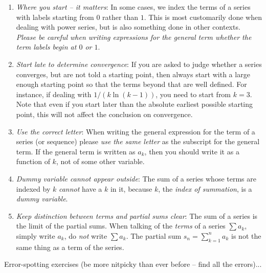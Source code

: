\documentclass[10pt]{amsart}
\begin{document}
\begin{enumerate}
\item {\em Where you start -- it matters}: In some cases, we index the
  terms of a series with labels starting from $0$ rather than
  $1$. This is most customarily done when dealing with power series,
  but is also something done in other contexts. {\em Please be careful
  when writing expressions for the general term whether the term
  labels begin at $0$ or $1$}.
\item {\em Start late to determine convergence}: If you are asked to
  judge whether a series converges, but are not told a starting point,
  then always start with a large enough starting point so that the
  terms beyond that are well defined. For instance, if dealing with
  $1/(k\ln(k - 1))$, you need to start from $k = 3$. Note that even if
  you start later than the absolute earliest possible starting point,
  this will not affect the conclusion on convergence.
\item {\em Use the correct letter}: When writing the general expression
  for the term of a series (or sequence) please {\em use the same
  letter} as the subscript for the general term. If the general term
  is written as $a_k$, then you should write it as a function of $k$,
  not of some other variable.
\item {\em Dummy variable cannot appear outside}: The sum of a series
  whose terms are indexed by $k$ {\em cannot} have a $k$ in it,
  because $k$, the {\em index of summation}, is a {\em dummy
  variable}.
\item {\em Keep distinction between terms and partial sums clear}: The
  sum of a series is the limit of the partial sums. When talking of
  the {\em terms} of a series $\sum a_k$, simply write $a_k$, do {\em
  not} write $\sum a_k$. The partial sum $s_n = \sum_{k=1}^n a_k$ is
  not the same thing as a term of the series.
\end{enumerate}

Error-spotting exercises (be more nitpicky than ever before -- find
all the errors)...
\end{document}
